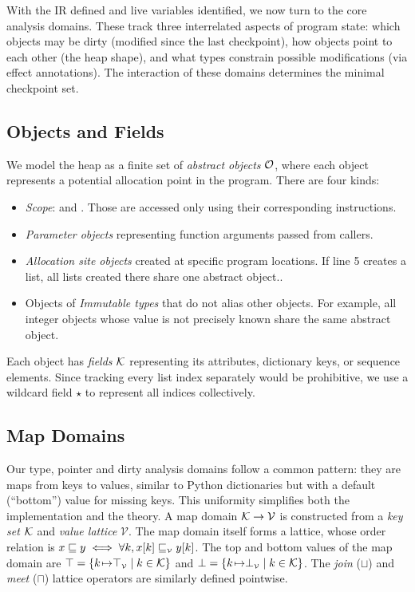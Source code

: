With the IR defined and live variables identified, we now turn to the core analysis domains. These track three interrelated aspects of program state: which objects may be dirty (modified since the last checkpoint), how objects point to each other (the heap shape), and what types constrain possible modifications (via effect annotations). The interaction of these domains determines the minimal checkpoint set.

\subsection{Objects and Fields}
We model the heap as a finite set of \emph{abstract objects} $\mathcal{O}$, where each object represents a potential allocation point in the program. There are four kinds:
\begin{itemize}
    \item \emph{Scope}: \tLOCALS and \tGLOBALS. Those are accessed only using their corresponding instructions.
    \item \emph{Parameter objects} representing function arguments passed from callers.
    \item \emph{Allocation site objects} created at specific program locations. If line 5 creates a list, all lists created there share one abstract object..
    \item Objects of \emph{Immutable types} that do not alias other objects. For example, all integer objects whose value is not precisely known share the same abstract object.
\end{itemize}
Each object has \emph{fields} $\mathcal{K}$ representing its attributes, dictionary keys, or sequence elements. Since tracking every list index separately would be prohibitive, we use a wildcard field $\star$ to represent all indices collectively.

\subsection{Map Domains}
Our type, pointer and dirty analysis domains follow a common pattern: they are maps from keys to values, similar to Python dictionaries but with a default (``bottom'') value for missing keys. This uniformity simplifies both the implementation and the theory.
A map domain $\mathcal{K}\to\mathcal{V}$ is constructed from a \emph{key set} $\mathcal{K}$ and \emph{value lattice} $\mathcal{V}$.
The map domain itself forms a lattice, whose order relation is 
$x\sqsubseteq y \iff \forall k,x[k]\sqsubseteq_{\scriptscriptstyle\mathcal{V}}y[k]$.
The top and bottom values of the map domain are
$\top=\{k{\hspace{1pt}\mapsto}\top_{\scriptscriptstyle\mathcal{V}}\mid k\in\mathcal{K}\}$
and
$\bot=\{k{\hspace{1pt}\mapsto}\bot_{\scriptscriptstyle\mathcal{V}}\mid k\in\mathcal{K}\}$.
The \emph{join} ($\sqcup$) and \emph{meet} ($\sqcap$) lattice operators are similarly defined pointwise.


